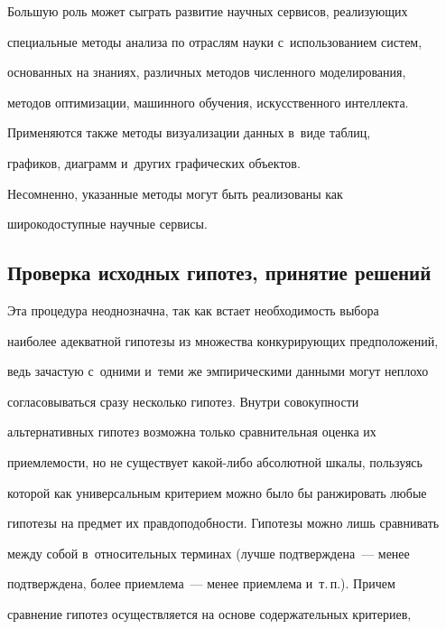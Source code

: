     Большую роль может сыграть развитие научных сервисов, ре\-а\-ли\-зу\-ющих 

специальные методы анализа по отраслям науки с~использованием сис\-тем, 

основанных на знаниях, различных методов численного моделирования, 

методов оптимизации, машинного обучения, искусственного интеллекта.

    

    Применяются также методы визуализации данных в~виде таблиц, 

графиков, диаграмм и~других графических объектов. 

    

    Несомненно, указанные методы могут быть реализованы как 

широкодоступные научные сервисы.

    



    

\subsection*{Проверка исходных гипотез, принятие решений}

    

    

    Эта процедура неоднозначна, так как встает необходимость выбора 

наиболее адекватной гипотезы из множества конкурирующих предположений, 

ведь за\-час\-тую с~одними и~теми же эмпирическими данными могут неплохо 

согласовываться сразу несколько гипотез. Внутри совокупности 

альтернативных гипотез возможна только сравнительная оценка их 

приемлемости, но не существует ка\-кой-ли\-бо абсолютной шкалы, пользуясь 

которой как универсальным критерием можно было бы ранжировать любые 

гипотезы на предмет их правдоподобности. Гипотезы можно лишь сравнивать 

между собой в~относительных терминах (лучше подтверждена~--- менее 

подтверждена, более приемлема~--- менее приемлема и~т.\,п.). Причем 

сравнение гипотез осуществляется на основе содержательных критериев, 

